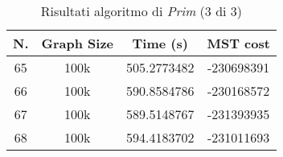 \begin{table}[H]
	\centering
	\begin{tabular}{|c|c|c|c|}
		\hline
		\textbf{N.} & \textbf{Graph Size} & \textbf{Time (s)} & \textbf{MST cost}\\
		\hline
		65 & 100k & 505.2773482 & -230698391\\
		\hline
		66 & 100k & 590.8584786 & -230168572\\
		\hline
		67 & 100k & 589.5148767 & -231393935\\
		\hline
		68 & 100k & 594.4183702 & -231011693\\
		\hline
	\end{tabular}
\caption{Risultati algoritmo di \textit{Prim} (3 di 3)}
\end{table}